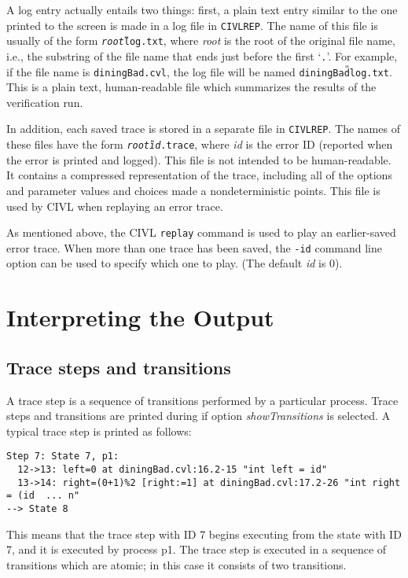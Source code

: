A log entry actually entails two things: first, a plain text entry
similar to the one printed to the screen is made in a log file in
\texttt{CIVLREP}.  The name of this file is usually of the form
\texttt{\textit{root}{\U}log.txt}, where \textit{root} is the root of
the original file name, i.e., the substring of the file name that ends
just before the first `\texttt{.}'.  For example, if the file name is
\texttt{diningBad.cvl}, the log file will be named
\texttt{diningBad{\U}log.txt}.  This is a plain text, human-readable
file which summarizes the results of the verification run.

In addition, each saved trace is stored in a separate file in
\texttt{CIVLREP}.  The names of these files have the form
\texttt{\textit{root}{\U}\textit{id}.trace}, where \textit{id} is the
error ID (reported when the error is printed and logged).  This file
is not intended to be human-readable.  It contains a compressed
representation of the trace, including all of the options and
parameter values and choices made a nondeterministic points.  
This file is used by CIVL when replaying an error trace.

As mentioned above, the CIVL \texttt{replay} command is used to play
an earlier-saved error trace.  When more than one trace has been
saved, the \texttt{-id} command line option can be used to specify
which one to play. (The default \emph{id} is 0).

\chapter{Interpreting the Output}

\section{Trace steps and transitions}

A trace step is a sequence of transitions performed by a particular process. 
Trace steps and transitions are printed during if option
\emph{showTransitions} is selected.  A typical trace step is printed
as follows:

\begin{verbatim}
Step 7: State 7, p1:
  12->13: left=0 at diningBad.cvl:16.2-15 "int left = id"
  13->14: right=(0+1)%2 [right:=1] at diningBad.cvl:17.2-26 "int right = (id  ... n"
--> State 8
\end{verbatim}

This means that the trace step with ID 7 begins executing from the state with
ID 7, and it is executed by process p1.  The trace step
is executed in a sequence of transitions which are atomic; 
in this case it consists of two transitions.

